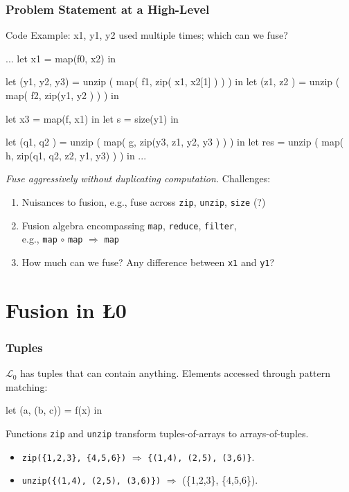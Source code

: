 \documentclass{beamer}
\renewcommand{\emph}[1]{\textcolor{structure}{#1}}
\newcommand{\emp}[1]{\textcolor{DikuRed}{ #1}}
\newcommand{\LO}{$\mathcal{L}_0$}
\begin{document}
\begin{frame}[fragile]
  \frametitle{Problem Statement at a High-Level}

\begin{block}{Code Example: x1, y1, y2 used multiple times; which can we fuse?  }
\begin{colorcode}
...
let \emp{x1} = map(f0, x2) in

let (\emph{y1}, y2, y3) = unzip ( map( f1, zip(\emp{x1}, x2[1]         ) ) ) in
let (z1, z2    ) = unzip ( map( f2, zip(\emph{y1}, y2            ) ) ) in

let x3 = map(f,  \emp{x1}) in
let s  = size(\emph{y1})    in

let (q1, q2    ) = unzip ( map( g,  zip(y3, z1, y2, y3    ) ) ) in
let res          = unzip ( map( h,  zip(q1, q2, z2, \emph{y1}, y3) ) ) in
    ...
\end{colorcode}
\end{block}

{\em Fuse aggressively without duplicating computation.} Challenges:
\begin{enumerate}
    \item Nuisances to fusion, e.g., fuse across {\tt zip}, {\tt unzip}, {\tt size} (?)
    \item Fusion algebra encompassing {\tt map}, {\tt reduce}, {\tt filter},\\
            e.g., {\tt map} $\circ$ {\tt map} $\Rightarrow$ {\tt map}
    \item How much can we fuse?  Any difference between \emp{\tt x1} and \emph{\tt y1}?
\end{enumerate}

\end{frame}

\section{Fusion in \L0{}}

\begin{frame}[fragile,t]
  \frametitle{Tuples}

  \LO{} has tuples that can contain anything.  Elements accessed
  through pattern matching:

\begin{colorcode}
  let (a, (b, c)) = f(x) in
\end{colorcode}

\pause

Functions {\tt zip} and {\tt unzip} transform tuples-of-arrays to
arrays-of-tuples.

\begin{itemize}
\item {\tt zip(\{1,2,3\}, \{4,5,6\})} $\Rightarrow$ {\tt \{(1,4),
    (2,5), (3,6)\}}.
\item {\tt unzip(\{(1,4), (2,5), (3,6)\})} $\Rightarrow$ (\{1,2,3\},
  \{4,5,6\}).
\end{itemize}

\end{frame}
\end{document}
